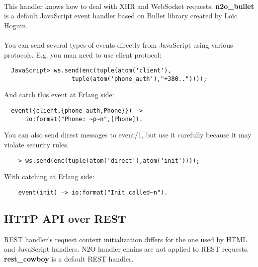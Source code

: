 \paragraph{}
This handler knows how to deal with XHR and WebSocket requests.
{\bf {n2o}\_{bullet}} is a default JavaScript event handler
based on Bullet library created by Loïc Hoguin.

\paragraph{}
You can send several types of events directly from JavaScript
using various protocols. E.g. you man need to use client protocol:

\vspace{1\baselineskip}
\begin{lstlisting}
  JavaScript> ws.send(enc(tuple(atom('client'),
                   tuple(atom('phone_auth'),"+380.."))));
\end{lstlisting}
\vspace{1\baselineskip}

And catch this event at Erlang side:

\vspace{1\baselineskip}
\begin{lstlisting}
  event({client,{phone_auth,Phone}}) ->
      io:format("Phone: ~p~n",[Phone]).
\end{lstlisting}
\vspace{1\baselineskip}

You can also send direct messages to event/1, but use it carefully
because it may violate security rules.

\vspace{1\baselineskip}
\begin{lstlisting}
    > ws.send(enc(tuple(atom('direct'),atom('init'))));
\end{lstlisting}
\vspace{1\baselineskip}

With catching at Erlang side:

\vspace{1\baselineskip}
\begin{lstlisting}
    event(init) -> io:format("Init called~n").
\end{lstlisting}
\vspace{1\baselineskip}

\newpage
\subsection{HTTP API over REST}
REST handler's request context initialization differs for the one
used by HTML and JavaScript handlers. N2O handler chains are not
applied to REST requests. {\bf rest\_cowboy} is a default REST
handler.

